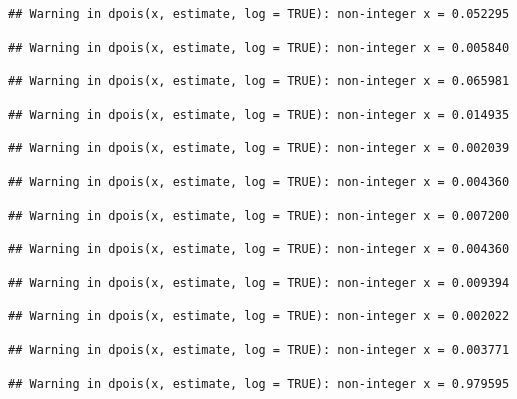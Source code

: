 \documentclass[]{article}
\begin{document}
\begin{verbatim}
## Warning in dpois(x, estimate, log = TRUE): non-integer x = 0.052295
\end{verbatim}

\begin{verbatim}
## Warning in dpois(x, estimate, log = TRUE): non-integer x = 0.005840
\end{verbatim}

\begin{verbatim}
## Warning in dpois(x, estimate, log = TRUE): non-integer x = 0.065981
\end{verbatim}

\begin{verbatim}
## Warning in dpois(x, estimate, log = TRUE): non-integer x = 0.014935
\end{verbatim}

\begin{verbatim}
## Warning in dpois(x, estimate, log = TRUE): non-integer x = 0.002039
\end{verbatim}

\begin{verbatim}
## Warning in dpois(x, estimate, log = TRUE): non-integer x = 0.004360
\end{verbatim}

\begin{verbatim}
## Warning in dpois(x, estimate, log = TRUE): non-integer x = 0.007200
\end{verbatim}

\begin{verbatim}
## Warning in dpois(x, estimate, log = TRUE): non-integer x = 0.004360
\end{verbatim}

\begin{verbatim}
## Warning in dpois(x, estimate, log = TRUE): non-integer x = 0.009394
\end{verbatim}

\begin{verbatim}
## Warning in dpois(x, estimate, log = TRUE): non-integer x = 0.002022
\end{verbatim}

\begin{verbatim}
## Warning in dpois(x, estimate, log = TRUE): non-integer x = 0.003771
\end{verbatim}

\begin{verbatim}
## Warning in dpois(x, estimate, log = TRUE): non-integer x = 0.979595
\end{verbatim}
\end{document}

